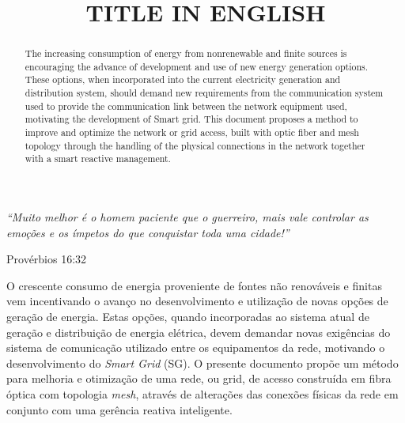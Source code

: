 \documentclass[openright]{normas-utf-tex} %
\title{\MakeUppercase{Title in English}} %
\begin{document}
\capa %
\folhaderosto %

\fichacatpgbib{\pageref{bibstart}-\pageref{bibend}}
\fichacat

%

%

\begin{epigrafe}
\epigraph{\emph{``Muito melhor é o homem paciente que o guerreiro, mais vale controlar as emoções e os ímpetos do que conquistar toda uma cidade!''}}{Provérbios 16:32}
\end{epigrafe}

\begin{resumo}
O crescente consumo de energia proveniente de fontes não renováveis e finitas vem incentivando o avanço no desenvolvimento e utilização de novas opções de geração de energia. Estas opções, quando incorporadas ao sistema atual de geração e distribuição de energia elétrica, devem demandar novas exigências do sistema de comunicação utilizado entre os equipamentos da rede, motivando o desenvolvimento do \emph{Smart Grid} (SG). O presente documento propõe um método para melhoria e otimização de uma rede, ou grid, de acesso construída em fibra óptica com topologia \emph{mesh}, através de alterações das conexões físicas da rede em conjunto com uma gerência reativa inteligente.
\end{resumo}

\begin{abstract}
The increasing consumption of energy from nonrenewable and finite sources is encouraging the advance of development and use
of new energy generation options. These options, when incorporated into the current electricity generation and distribution system,
should demand new requirements from the communication system used to provide the communication link between the network
equipment used, motivating the development of Smart grid. This document proposes a method to improve and optimize the network
or grid access, built with optic fiber and mesh topology through the handling of the physical connections in the network together with
a smart reactive management.
\end{abstract}
\end{document}
